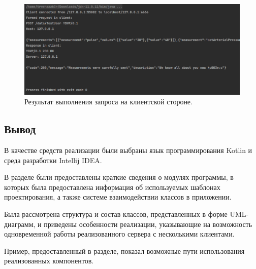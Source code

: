 \begin{figure}[H]
\begin{center}
\includegraphics[width=\textwidth]{img/clientOutput.png}
\captionsetup{justification=centering}
	\caption{Результат выполнения запроса на клиентской стороне. }
	\label{fig:clientOutput}
\end{center}
\end{figure}

\subsection*{Вывод}
В качестве средств реализации были выбраны язык программирования Kotlin и среда разработки Intellij IDEA.

В разделе были предоставлены краткие сведения о модулях программы, в которых была предоставлена информация об используемых шаблонах проектирования, а также системе взаимодействии классов в приложении.

Была рассмотрена структура и состав классов, представленных в форме UML-диаграмм, и приведены особенности реализации, указывающие на возможность одновременной работы реализованного сервера с несколькими клиентами.

Пример, предоставленный в разделе, показал возможные пути использования реализованных компонентов.